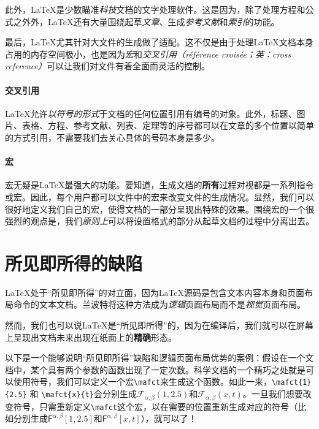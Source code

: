 此外，\LaTeX 是少数瞄准\textit{科技}文档的文字处理软件。这是因为，除了处理方程和公式之外外，\LaTeX 还有大量围绕起草\textit{文章}、生成\textit{参考文献}和\textit{索引}的功能。

最后，\LaTeX 尤其针对大文件的生成做了适配。这不仅是由于处理\LaTeX 文档本身占用的内存空间极小，也是因为\textit{宏}和\textit{交叉引用（référence croisée；英：cross reference）}可以让我们对文件有着全面而灵活的控制。

\paragraph*{交叉引用}\LaTeX 允许\textit{以符号的形式}于文档的任何位置引用有编号的对象。此外，标题、图片、表格、方程、参考文献、列表、定理等的序号都可以在文章的多个位置以简单的方式引用，不需要我们去关心具体的号码本身是多少。

\paragraph*{宏}宏无疑是\LaTeX 最强大的功能。要知道，生成文档的\textbf{所有}过程对视都是一系列指令或宏。因此，每个用户都可以文件中的宏来改变文件的生成情况。显然，我们可以很好地定义我们自己的宏，使得文档的一部分呈现出特殊的效果。围绕宏的一个很强烈的观点是，我们\textit{原则上}可以将设置格式的部分从起草文档的过程中分离出去。

\section*{所见即所得的缺陷}

\LaTeX 处于“所见即所得”的对立面，因为\LaTeX 源码是包含文本内容本身和页面布局命令的文本文档。兰波特将这种方法成为\textit{逻辑}页面布局而不是\textit{视觉}页面布局。

然而，我们也可以说\LaTeX 是“所见即所得”的，因为在编译后，我们就可以在屏幕上呈现出文档未来出现在纸面上的\textbf{精确}形态。

以下是一个能够说明“所见即所得”缺陷和逻辑页面布局优势的案例：假设在一个文档中，某个具有两个参数的函数出现了一定次数。科学文档的一个精巧之处就是可以使用符号，我们可以定义一个宏\texttt{\backslash mafct}来生成这个函数。如此一来，\texttt{\backslash mafct\{1\}\{2.5\}} 和 \texttt{\backslash mafct\{x\}\{t\}}会分别生成$\mathcal{F}_{\alpha, \beta}(1, 2.5)$和$\mathcal{F}_{\alpha, \beta}(x, t)$。一旦我们想要改变符号，只需重新定义\texttt{\backslash mafct}这个宏，以在需要的位置重新生成对应的符号（比如分别生成$\mathsf{F}^{\alpha, \beta}[1, 2.5]$和$\mathsf{F}^{\alpha, \beta}[x, t]$），就可以了！

